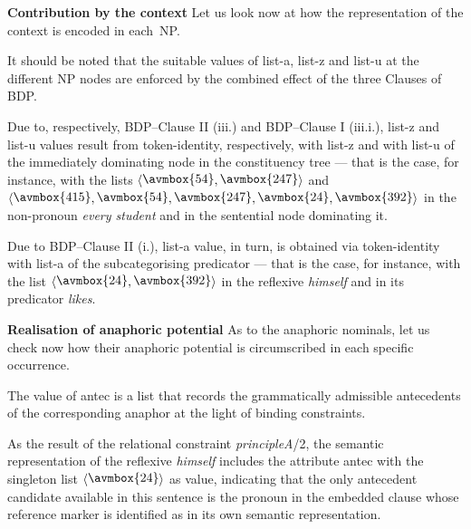 \documentclass[output=paper
,modfonts
,nonflat]{langsci/langscibook}
\begin{document}
\vspace{5mm}
\textbf{Contribution by the context} Let us look now at how the representation of the context
is encoded in each~NP.

It should be noted that the suitable values of {\sc list-a}, {\sc list-z} 
and {\sc list-u} at the different NP nodes are enforced 
by the combined effect of the three Clauses of BDP. 

Due to, respectively, BDP--Clause II (iii.) and BDP--Clause I (iii.i.), {\sc list-z} and 
{\sc list-u} values result from token-identity, respectively, with {\sc list-z}
and with {\sc list-u} of the immediately dominating node in the 
constituency tree --- that is the case, for instance, with the lists 
$\langle\raisebox{.25ex}{\avmbox{54}},\raisebox{.25ex}{\avmbox{247}}\rangle$
and 
$\langle\raisebox{.25ex}{\avmbox{415}},\raisebox{.25ex}{\avmbox{54}},\raisebox{.25ex}{\avmbox{247}},\raisebox{.25ex}{\avmbox{24}},\raisebox{.25ex}{\avmbox{392}}\rangle$
in the non-pronoun \emph{every student} and in the sentential node dominating it. 

Due to BDP--Clause II (i.),
{\sc list-a} value, in turn, is obtained via token-identity with {\sc list-a} of
the subcategorising predicator --- that is the case, for instance, with the list 
$\langle\raisebox{.25ex}{\avmbox{24}},\raisebox{.25ex}{\avmbox{392}}\rangle$
in the reflexive \emph{himself} and in its predicator \emph{likes}. 



\textbf{Realisation of anaphoric potential} As to the anaphoric nominals, let us check now how their
anaphoric potential is circumscribed in each specific occurrence.

The value of {\sc antec} is a
list that records the grammatically admissible antecedents of the
corresponding anaphor at the light of binding constraints.

As the result of the relational constraint \emph{principleA}/2, the semantic
representation of the reflexive \emph{himself} includes the attribute
{\sc antec} with the singleton list 
$\langle\raisebox{.25ex}{\avmbox{24}}\rangle$
as value, indicating that the only antecedent candidate
available in this sentence is the pronoun in the embedded clause whose
reference marker is identified as
in its own
semantic representation. 
\end{document}
